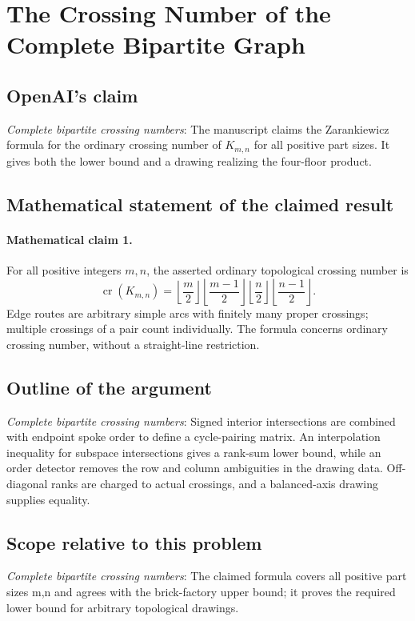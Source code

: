 \documentclass[11pt]{article}
\begin{document}
\section*{The Crossing Number of the Complete Bipartite Graph}

\subsection{OpenAI's claim}
\textit{Complete bipartite crossing numbers}: The manuscript claims the Zarankiewicz formula for the ordinary crossing number of $K_{m,n}$ for all positive part sizes. It gives both the lower bound and a drawing realizing the four-floor product.

\subsection{Mathematical statement of the claimed result}
\paragraph{Mathematical claim 1.} For all positive integers $m,n$, the asserted ordinary topological crossing number is \[\operatorname{cr}(K_{m,n})=\left\lfloor\frac m2\right\rfloor\left\lfloor\frac{m-1}2\right\rfloor\left\lfloor\frac n2\right\rfloor\left\lfloor\frac{n-1}2\right\rfloor.\] Edge routes are arbitrary simple arcs with finitely many proper crossings; multiple crossings of a pair count individually. The formula concerns ordinary crossing number, without a straight-line restriction.

\subsection{Outline of the argument}
\textit{Complete bipartite crossing numbers}: Signed interior intersections are combined with endpoint spoke order to define a cycle-pairing matrix. An interpolation inequality for subspace intersections gives a rank-sum lower bound, while an order detector removes the row and column ambiguities in the drawing data. Off-diagonal ranks are charged to actual crossings, and a balanced-axis drawing supplies equality.

\subsection{Scope relative to this problem}
\textit{Complete bipartite crossing numbers}: The claimed formula covers all positive part sizes m,n and agrees with the brick-factory upper bound; it proves the required lower bound for arbitrary topological drawings.
\end{document}
